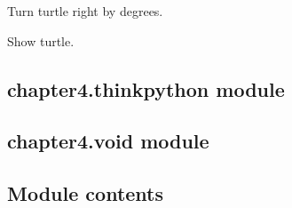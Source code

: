 \documentclass[letterpaper,10pt,english]{sphinxmanual}
\begin{document}
\begin{fulllineitems}
\label{\detokenize{chapter4:chapter4.jupyturtle.rt}}
\pysigstartsignatures
{}
\pysigstopsignatures
\sphinxAtStartPar
Turn turtle right by degrees.

\end{fulllineitems}


\begin{fulllineitems}
\label{\detokenize{chapter4:chapter4.jupyturtle.show}}
\pysigstartsignatures
{}
\pysigstopsignatures
\sphinxAtStartPar
Show turtle.

\end{fulllineitems}



\subsection{chapter4.thinkpython module}
\label{\detokenize{chapter4:chapter4-thinkpython-module}}

\subsection{chapter4.void module}
\label{\detokenize{chapter4:module-chapter4.void}}\label{\detokenize{chapter4:chapter4-void-module}}

\begin{fulllineitems}
\label{\detokenize{chapter4:chapter4.void.toto}}
\pysigstartsignatures
{}
\pysigstopsignatures
\end{fulllineitems}



\subsection{Module contents}
\label{\detokenize{chapter4:module-chapter4}}\label{\detokenize{chapter4:module-contents}}
\sphinxstepscope
\end{document}

